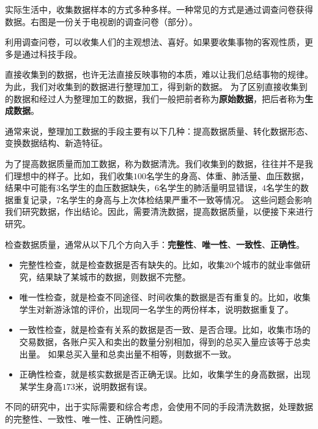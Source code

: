\documentclass[12pt,UTF8,fontset=none]{ctexbook}
\begin{document}
实际生活中，收集数据样本的方式多种多样。一种常见的方式是通过调查问卷获得数据。右图是一份关于电视剧的调查问卷（部分）。

利用调查问卷，可以收集人们的主观想法、喜好。如果要收集事物的客观性质，更多是通过科技手段。

直接收集到的数据，也许无法直接反映事物的本质，难以让我们总结事物的规律。
为此，我们对收集到的数据进行整理加工，得到新的数据。
为了区别直接收集到的数据和经过人为整理加工的数据，我们一般把前者称为\textbf{原始数据}，把后者称为\textbf{生成数据}。

通常来说，整理加工数据的手段主要有以下几种：提高数据质量、转化数据形态、变换数据结构、新造特征。

为了提高数据质量而加工数据，称为数据清洗。我们收集到的数据，往往并不是我们理想中的样子。比如，我们收集$100$名学生的身高、体重、肺活量、血压数据，
结果中可能有$3$名学生的血压数据缺失，$6$名学生的肺活量明显错误，$4$名学生的数据重复记录，$7$名学生的身高与上次体检结果严重不一致等情况。
这些问题会影响我们研究数据，作出结论。因此，需要清洗数据，提高数据质量，以便接下来进行研究。

检查数据质量，通常从以下几个方向入手：\textbf{完整性}、\textbf{唯一性}、\textbf{一致性}、\textbf{正确性}。
\begin{itemize}
    \item 完整性检查，就是检查数据是否有缺失的。比如，收集$20$个城市的就业率做研究，结果缺了某城市的数据，则数据不完整。
    \item 唯一性检查，就是检查不同途径、时间收集的数据是否有重复的。比如，收集学生对新游泳馆的评价，出现同一名学生的两份样本，说明数据重复了。
    \item 一致性检查，就是检查有关系的数据是否一致、是否合理。比如，收集市场的交易数据，各账户买入和卖出的数量分别相加，得到的总买入量应该等于总卖出量。
    如果总买入量和总卖出量不相等，则数据不一致。
    \item 正确性检查，就是核实数据是否正确无误。比如，收集学生的身高数据，出现某学生身高$173$米，说明数据有误。
\end{itemize}
不同的研究中，出于实际需要和综合考虑，会使用不同的手段清洗数据，处理数据的完整性、一致性、唯一性、正确性问题。
\end{document}
